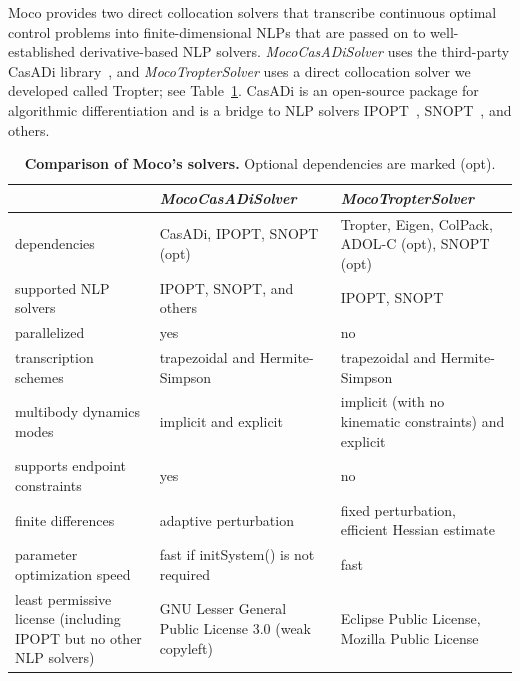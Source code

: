 \documentclass[10pt,letterpaper]{article}
\begin{document}
Moco provides two direct collocation solvers that transcribe continuous optimal control problems into finite-dimensional NLPs that are passed on to well-established derivative-based NLP solvers. \textit{MocoCasADiSolver} uses the third-party CasADi library~\cite{Andersson:2019}, and \textit{MocoTropterSolver} uses a direct collocation solver we developed called Tropter; see Table~\ref{tab:solvers}. CasADi is an open-source package for algorithmic differentiation and is a bridge to NLP solvers IPOPT~\cite{Wachter:2006}, SNOPT~\cite{Gill:2005}, and others.

\begin{table}[!ht]
    \begin{adjustwidth}{-2.25in}{0in} %
        \centering
        \caption{
        {\bf Comparison of Moco’s solvers.} Optional dependencies are marked (opt).}
        \begin{tabular}{p{2.1in}p{2.1in}p{2.1in}}
            \toprule
             & \textbf{\textit{MocoCasADiSolver}} & \textbf{\textit{MocoTropterSolver}} \\ \midrule
            dependencies & CasADi, IPOPT, SNOPT (opt) & Tropter, Eigen, ColPack, ADOL-C (opt), SNOPT (opt) \\ \midrule
            supported NLP solvers & IPOPT, SNOPT, and others & IPOPT, SNOPT \\ \midrule
            parallelized & yes & no \\ \midrule
            transcription schemes & trapezoidal and Hermite-Simpson & trapezoidal and Hermite-Simpson \\ \midrule
            multibody dynamics modes & implicit and explicit & implicit (with no kinematic constraints) and explicit \\ \midrule
            supports endpoint constraints & yes & no \\ \midrule
            finite differences & adaptive perturbation & fixed perturbation, efficient Hessian estimate~\cite{Bohme:20179} \\ \midrule
            parameter optimization speed & fast if initSystem() is not required & fast \\ \midrule
            least permissive license (including IPOPT but no other NLP solvers) & GNU Lesser General Public License 3.0 (weak copyleft) & Eclipse Public License, Mozilla Public License \\ \bottomrule
        \end{tabular}
        \label{tab:solvers}
    \end{adjustwidth}
\end{table}
\end{document}
